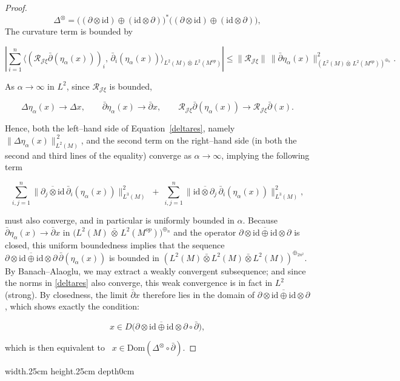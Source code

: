 \documentclass[10pt,a4paper,reqno]{amsart}
\def\qed{ \hfill \vrule width.25cm height.25cm depth0cm\smallskip}
\newcommand{\Dom}{\mathrm{Dom}}
\begin{document}
\begin{proof}
\[
\Delta^{\otimes}
=
\big((\partial\otimes \mathrm{id})\oplus(\mathrm{id}\otimes \partial)\big)^{*}
\big((\partial\otimes \mathrm{id})\oplus(\mathrm{id}\otimes \partial)\big),
\]
The curvature term is bounded by


\[
\left|\sum_{i=1}^n \big\langle (\mathcal{R}_{\mathscr{J}\xi}\bar\partial(\eta_{\alpha}(x)))_i,\,\bar\partial_i(\eta_{\alpha}(x))\big\rangle_{L^2(M){\bar\otimes}\,L^2(M^{op})}\right|
\le \|\mathcal{R}_{\mathscr{J}\xi}\|\,\|\bar\partial \eta_{\alpha}(x)\|_{(L^2(M){\bar\otimes}\,L^2(M^{op}))^{\oplus_n}}^2.
\]



\smallskip

As $\alpha\to\infty$ in $L^2$, since $\mathcal R_{\mathscr J\xi}$ is bounded,

\[
\Delta \eta_{\alpha}(x)\to \Delta x,\qquad
\bar\partial \eta_{\alpha}(x)\to \bar\partial x,\qquad
\mathcal{R}_{\mathscr{J}\xi}\bar\partial(\eta_{\alpha}(x))\to \mathcal{R}_{\mathscr{J}\xi}\bar\partial(x).
\]


Hence, both the left–hand side of Equation~\ref{deltares}, namely 
$\|\Delta \eta_{\alpha}(x)\|_{L^2(M)}^{\,2}$, and the second term on the 
right–hand side (in both the second and third lines of the equality) 
converge as $\alpha\to\infty$, implying the following term


\[
\sum_{i,j=1}^n 
\big\|\overline{\partial_j\otimes \mathrm{id}}\,\bar\partial_i(\eta_{\alpha}(x))\big\|_{L^3(M)}^{2}
\;+\;
\sum_{i,j=1}^n 
\big\|\overline{\mathrm{id}\otimes \partial_j}\,\bar\partial_i(\eta_{\alpha}(x))\big\|_{L^3(M)}^{2},
\]


must also converge, and in particular is uniformly bounded in $\alpha$.
\newline
Because $\bar\partial\eta_\alpha(x)\to \bar\partial x$ in 
$\big(L^2(M)\,\bar\otimes\,L^2(M^{op})\big)^{\oplus_n}$ and the operator 
$\overline{\partial\otimes \mathrm{id}\oplus \mathrm{id}\otimes\partial}$ 
is closed, this uniform boundedness implies that the sequence 
$\overline{\partial\otimes \mathrm{id}\oplus \mathrm{id}\otimes\partial}\,
\bar\partial(\eta_\alpha(x))$ is bounded in $(L^2(M)\bar\otimes L^2(M)\bar\otimes L^2(M))^{\oplus_{2n^2}}$.  
By Banach--Alaoglu, we may extract a weakly convergent subsequence; and since 
the norms in \eqref{deltares} also converge, this weak convergence is in fact in $L^2$
(strong).  
By closedness, the limit $\bar\partial x$ therefore lies in the domain of 
$\overline{\partial\otimes \mathrm{id}\oplus \mathrm{id}\otimes\partial}$, 
which shows exactly the condition:


\[
x\in D\big(\overline{\partial\otimes \mathrm{id}\oplus\mathrm{id}\otimes \partial}\circ\bar\partial\big),
\]


which is then equivalent to \ $x\in \Dom(\Delta^{\otimes}\circ \bar\partial)$.
\end{proof}
\qed
\end{document}
